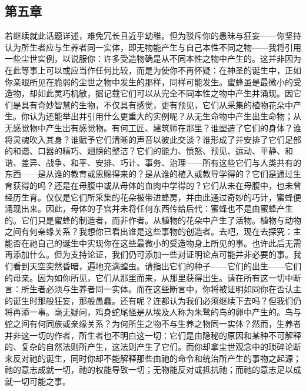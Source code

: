 
\subsection{第五章}

\par

若继续就此话题详述，难免冗长且近乎幼稚。但为驳斥你的愚昧与狂妄——你坚持认为所生者应与生养者同一实体，即无物能产生与自己本性不同之物——我将引用一些尘世实例，以说服你：许多受造物确是从不同本性之物中产生的。这并非因为在此等事上可以或应当作任何比较，而是为使你不再怀疑：在神圣的诞生中，正如你亲眼所见在脆弱的尘世之物中发生的那样，同样可能发生。蜜蜂虽是最微小的受造物，却如此灵巧机敏，据记载它们可以从完全不同本性之物中产生并涌现。因它们是具有奇妙智慧的生物，不仅具有感觉，更有预见，它们从采集的植物花朵中产生。你认为还能举出并引用什么更重大的实例呢？从无生命物中产生出生命物；从无感觉物中产生出有感觉物。有何工匠、建筑师在那里？谁塑造了它们的身体？谁将灵魂吹入其身？谁赋予它们清晰的声音以彼此交谈？谁形成了并安排了它们足部的和谐、口器的精巧、翅膀的整洁？它们的能力、愤怒、预见、运动、平静、和谐、差异、战争、和平、安排、巧计、事务、治理——所有这些它们与人类共有的东西——是从谁的教育或恩赐得来的？是从谁的植入或教导学得的？它们是通过生育获得的吗？还是在母腹中或从母体的血肉中学得的？它们从未在母腹中，也未曾经历生育。仅仅是它们所采集的花朵被带进蜂房，并由此通过奇妙的巧计，蜜蜂便涌现出来。因此，母体的子宫并未将任何东西传给后代：蜜蜂也不是由蜜蜂产生的。它们只是蜜蜂的制造者，而非作者。从植物的花朵中产生了活物。植物与动物之间有何亲缘关系？我想你已看出谁是这些事物的创造者。去吧，现在去探究：主能否在祂自己的诞生中实现你在这些最微小的受造物身上所见的事。也许此后无需再添加什么。但为支持论证，我们仍可添加一些对证明论点可能并非必要的事。我们看到天空突然昏暗，遍地充满蝗虫。请指出它们的种子——它们的出生——它们的母亲。因为如你所见，它们从那里而来，从那里获得出生。请在所有这一切中断言：所生者必须与生养者同一实体。而在这些断言中，你将被证明如同你在否认主的诞生时那般狂妄，那般愚蠢。还有呢？连都认为我们必须继续下去吗？但我们仍将再添一事。毫无疑问，鸡身蛇尾怪是从埃及人称为朱鹭的鸟的卵中产生的。鸟与蛇之间有何同族或亲缘关系？为何所生之物不与生养之物同一实体？然而，生养者并非这一切的作者，所生者也不明白这一切：它们是由隐秘的原因和某种不可解释的、复杂的自然法则所产生，这法则产生了它们。而你却拿尘世观念中的琐碎论断来反对祂的诞生，同时你却不能解释那些由祂的命令和统治所产生的事物之起源；祂的意志成就一切，祂的权能导致一切；无物能反对或抵抗祂；而祂的意志足以成就一切可能之事。\par

